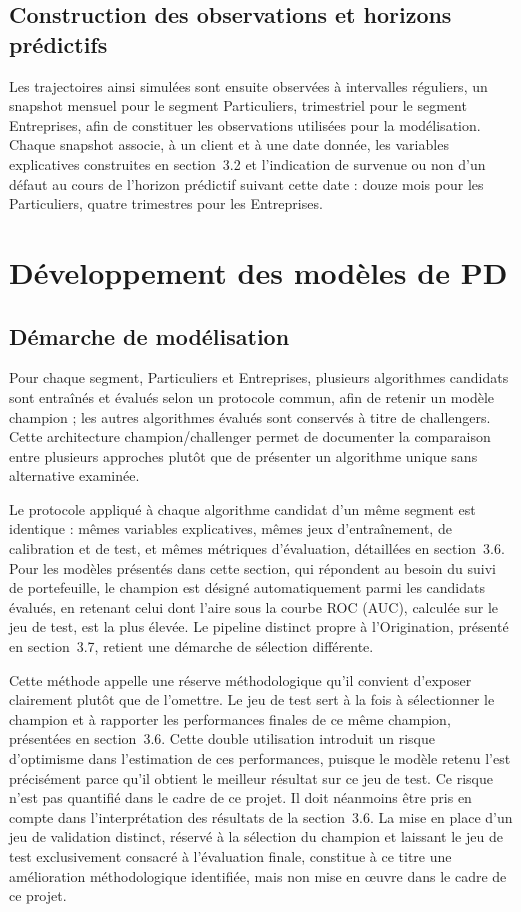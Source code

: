 \subsection{Construction des observations et horizons prédictifs}

Les trajectoires ainsi simulées sont ensuite observées à intervalles réguliers, un snapshot mensuel pour le segment Particuliers, trimestriel pour le segment Entreprises, afin de constituer les observations utilisées pour la modélisation. Chaque snapshot associe, à un client et à une date donnée, les variables explicatives construites en section~3.2 et l'indication de survenue ou non d'un défaut au cours de l'horizon prédictif suivant cette date : douze mois pour les Particuliers, quatre trimestres pour les Entreprises.

\section{Développement des modèles de PD}

\subsection{Démarche de modélisation}

Pour chaque segment, Particuliers et Entreprises, plusieurs algorithmes candidats sont entraînés et évalués selon un protocole commun, afin de retenir un modèle champion ; les autres algorithmes évalués sont conservés à titre de challengers. Cette architecture champion/challenger permet de documenter la comparaison entre plusieurs approches plutôt que de présenter un algorithme unique sans alternative examinée.

Le protocole appliqué à chaque algorithme candidat d'un même segment est identique : mêmes variables explicatives, mêmes jeux d'entraînement, de calibration et de test, et mêmes métriques d'évaluation, détaillées en section~3.6. Pour les modèles présentés dans cette section, qui répondent au besoin du suivi de portefeuille, le champion est désigné automatiquement parmi les candidats évalués, en retenant celui dont l'aire sous la courbe ROC (AUC), calculée sur le jeu de test, est la plus élevée. Le pipeline distinct propre à l'Origination, présenté en section~3.7, retient une démarche de sélection différente.

Cette méthode appelle une réserve méthodologique qu'il convient d'exposer clairement plutôt que de l'omettre. Le jeu de test sert à la fois à sélectionner le champion et à rapporter les performances finales de ce même champion, présentées en section~3.6. Cette double utilisation introduit un risque d'optimisme dans l'estimation de ces performances, puisque le modèle retenu l'est précisément parce qu'il obtient le meilleur résultat sur ce jeu de test. Ce risque n'est pas quantifié dans le cadre de ce projet. Il doit néanmoins être pris en compte dans l'interprétation des résultats de la section~3.6. La mise en place d'un jeu de validation distinct, réservé à la sélection du champion et laissant le jeu de test exclusivement consacré à l'évaluation finale, constitue à ce titre une amélioration méthodologique identifiée, mais non mise en \oe{}uvre dans le cadre de ce projet.

